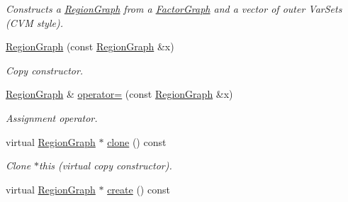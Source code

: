 \begin{CompactItemize}
\begin{CompactList}\small\item\em Constructs a \hyperlink{classdai_1_1RegionGraph}{RegionGraph} from a \hyperlink{classdai_1_1FactorGraph}{FactorGraph} and a vector of outer VarSets (CVM style). \item\end{CompactList}\item 
\hypertarget{classdai_1_1RegionGraph_cfd5a9c99ed3725a4630b7900a4a32e1}{
\hyperlink{classdai_1_1RegionGraph_cfd5a9c99ed3725a4630b7900a4a32e1}{RegionGraph} (const \hyperlink{classdai_1_1RegionGraph}{RegionGraph} \&x)}
\label{classdai_1_1RegionGraph_cfd5a9c99ed3725a4630b7900a4a32e1}

\begin{CompactList}\small\item\em Copy constructor. \item\end{CompactList}\item 
\hypertarget{classdai_1_1RegionGraph_deb3664382c754e79148267239894ab3}{
\hyperlink{classdai_1_1RegionGraph}{RegionGraph} \& \hyperlink{classdai_1_1RegionGraph_deb3664382c754e79148267239894ab3}{operator=} (const \hyperlink{classdai_1_1RegionGraph}{RegionGraph} \&x)}
\label{classdai_1_1RegionGraph_deb3664382c754e79148267239894ab3}

\begin{CompactList}\small\item\em Assignment operator. \item\end{CompactList}\item 
\hypertarget{classdai_1_1RegionGraph_2d67c462b308b3acbec965ba10f1e6e2}{
virtual \hyperlink{classdai_1_1RegionGraph}{RegionGraph} $\ast$ \hyperlink{classdai_1_1RegionGraph_2d67c462b308b3acbec965ba10f1e6e2}{clone} () const }
\label{classdai_1_1RegionGraph_2d67c462b308b3acbec965ba10f1e6e2}

\begin{CompactList}\small\item\em Clone $\ast$this (virtual copy constructor). \item\end{CompactList}\item 
\hypertarget{classdai_1_1RegionGraph_1d68790861f6eb1f6e50ddb75c6c3201}{
virtual \hyperlink{classdai_1_1RegionGraph}{RegionGraph} $\ast$ \hyperlink{classdai_1_1RegionGraph_1d68790861f6eb1f6e50ddb75c6c3201}{create} () const }
\label{classdai_1_1RegionGraph_1d68790861f6eb1f6e50ddb75c6c3201}


\end{CompactItemize}
